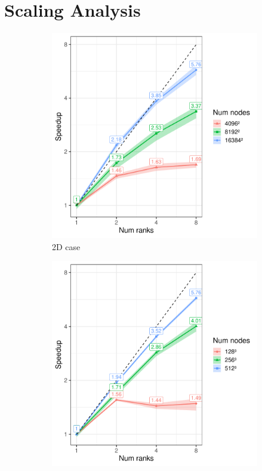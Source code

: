\section{Scaling Analysis}
\begin{figure}
    \centering
    \begin{subfigure}{0.49\textwidth}
        \centering
        \includegraphics[width=\linewidth]{figures/experiments/scaling_strong_2d.pdf}
        \caption{2D case}
        \label{fig:scalingStrong2D}
    \end{subfigure}
    \begin{subfigure}{0.49\textwidth}
        \centering
        \includegraphics[width=\linewidth]{figures/experiments/scaling_strong_3d.pdf}

\end{subfigure}
\end{figure}
